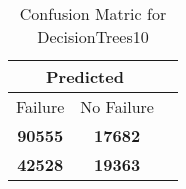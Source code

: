 \begin{table}[] 
\caption{Confusion Matric for DecisionTrees10} 
\label{Table: Prediction Accuracy-NoneDecisionTrees10OnlySunEKF-ignoreReflection100.9EKF-top2-Reflection} 
\centering 
\begin{tabular} 
 {@{}ccc@{}} 
\toprule 
\multicolumn{2}{c}{\textbf{Predicted}}
 \\ \midrule 
\multicolumn{1}{|c|}{Failure} & 
\multicolumn{1}{c|}{No Failure}
 \\ \midrule 
\multicolumn{1}{|c|}{\color{green}\textbf{90555}} & 
\multicolumn{1}{c|}{\color{red}\textbf{17682}}
 \\ \midrule 
\multicolumn{1}{|c|}{\color{red}\textbf{42528}} & 
\multicolumn{1}{c|}{\color{green}\textbf{19363}}
 \\ \bottomrule 
\end{tabular} 
\end{table} 
